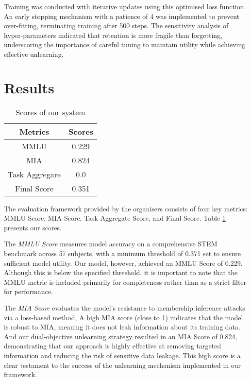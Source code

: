 \documentclass[11pt]{article}
\begin{document}
Training was conducted with iterative updates using this optimised loss function. An early stopping mechanism with a patience of 4 was implemented to prevent over-fitting, terminating training after 500 steps. The sensitivity analysis of hyper-parameters indicated that retention is more fragile than forgetting, underscoring the importance of careful tuning to maintain utility while achieving effective unlearning.

\section{Results}

\begin{table}[h]
    \centering
    \begin{tabular}{c|c}
        \hline
        \textbf{Metrics} & \textbf{Scores} \\
        \hline
       MMLU   & 0.229 \\
       MIA & 0.824 \\
       Task Aggregare & 0.0 \\
       Final Score & 0.351 \\
       \hline
    \end{tabular}
    \caption{Scores of our system}
    \label{tab:final_score}
\end{table}

The evaluation framework provided by the organisers consists of four key metrics: MMLU Score, MIA Score, Task Aggregate Score, and Final Score. Table \ref{tab:final_score} presents our scores.

The \textit{MMLU Score} measures model accuracy on a comprehensive STEM benchmark across 57 subjects, with a minimum threshold of 0.371 set to ensure sufficient model utility. Our model, however, achieved an MMLU Score of 0.229. Although this is below the specified threshold, it is important to note that the MMLU metric is included primarily for completeness rather than as a strict filter for performance.

The \textit{MIA Score} evaluates the model’s resistance to membership inference attacks via a loss-based method, A high MIA score (close to 1) indicates that the model is robust to MIA, meaning it does not leak information about its training data. And our dual-objective unlearning strategy resulted in an MIA Score of 0.824, demonstrating that our approach is highly effective at removing targeted information and reducing the risk of sensitive data leakage. This high score is a clear testament to the success of the unlearning mechanism implemented in our framework.
\end{document}
